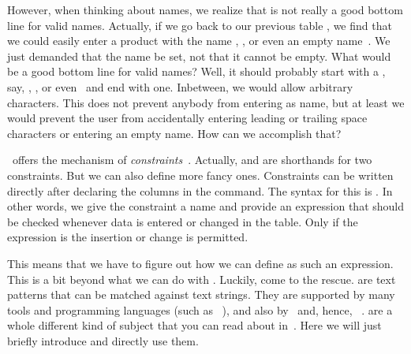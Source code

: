 However, when thinking about names, we realize that  is not really a good bottom line for valid names.
Actually, if we go back to our previous table , we find that we could easily enter a product with the name , , or even an empty name~.
We just demanded that the name be set, not that it cannot be empty.
What would be a good bottom line for valid names?
Well, it should probably start with a , say, , , or even~ and end with one.
Inbetween, we would allow arbitrary characters.
This does not prevent anybody from entering  as name, but at least we would prevent the user from accidentally entering leading or trailing space characters or entering an empty name.
How can we accomplish that?%
%
\begin{sloppypar}%
\sql\ offers the mechanism of \emph{constraints}~\cite{PGDG:PD:C}.
Actually,  and  are shorthands for two constraints.
But we can also define more fancy ones.
Constraints can be written directly after declaring the columns in the  command.
The syntax for this is .
In other words, we give the constraint a name and provide an expression that should be checked whenever data is entered or changed in the table.
Only if the expression is  the insertion or change is permitted.%
\end{sloppypar}%
%
This means that we have to figure out how we can define  as such an expression.
This is a bit beyond what we can do with .
Luckily,  come to the rescue.
 are text patterns that can be matched against text strings.
They are supported by many tools and programming languages (such as \python~\cite{programmingWithPython}), and also by \sql\ and, hence, \postgresql~\cite{PGDG:PD:PRE}.
 are a whole different kind of subject that you can read about in~\cite{PGDG:PD:PRE}.
Here we will just briefly introduce and directly use them.

